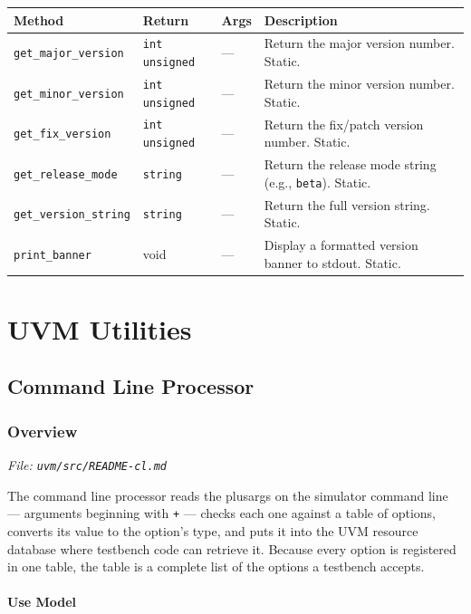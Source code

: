 \documentclass[11pt,letterpaper]{report}
\begin{document}
\begin{xltabular}{\linewidth}{>{\small}p{1.35in} >{\small}p{1.25in} >{\small}p{0.95in} >{\small}X}
\toprule
\textbf{Method} & \textbf{Return} & \textbf{Args} & \textbf{Description} \\
\midrule
\endhead
\bottomrule
\endfoot
\texttt{get\_major\_version} & \texttt{int unsigned} & --- & Return the major version number. Static. \\
\texttt{get\_minor\_version} & \texttt{int unsigned} & --- & Return the minor version number. Static. \\
\texttt{get\_fix\_version} & \texttt{int unsigned} & --- & Return the fix/patch version number. Static. \\
\texttt{get\_release\_mode} & \texttt{string} & --- & Return the release mode string (e.g., \texttt{beta}). Static. \\
\texttt{get\_version\_string} & \texttt{string} & --- & Return the full version string. Static. \\
\texttt{print\_banner} & void & --- & Display a formatted version banner to stdout. Static. \\
\end{xltabular}

\part{UVM Utilities}

\chapter{Command Line Processor}
\section{Overview}
\noindent\small\textit{File: \texttt{uvm/src/README-cl.md}}\par

The command line processor reads the plusargs on the simulator command line --- arguments beginning with \texttt{+} --- checks each one against a table of options, converts its value to the option's type, and puts it into the UVM resource database where testbench code can retrieve it. Because every option is registered in one table, the table is a complete list of the options a testbench accepts.

\subsection*{Use Model}
\end{document}
